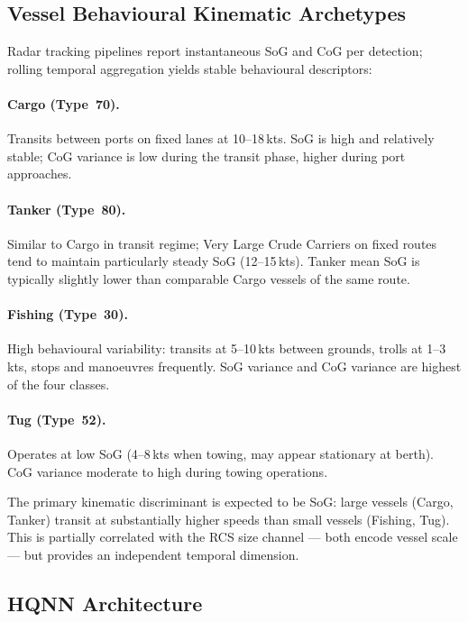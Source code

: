 \documentclass[journal]{IEEEtran}
\begin{document}
\subsection{Vessel Behavioural Kinematic Archetypes}

Radar tracking pipelines report instantaneous SoG and CoG per
detection; rolling temporal aggregation yields stable behavioural
descriptors:

\paragraph{Cargo (Type~70).} Transits between ports on fixed lanes at
10--18\,kts. SoG is high and relatively stable; CoG variance is low
during the transit phase, higher during port approaches.

\paragraph{Tanker (Type~80).} Similar to Cargo in transit regime; Very
Large Crude Carriers on fixed routes tend to maintain particularly
steady SoG (12--15\,kts). Tanker mean SoG is typically slightly lower
than comparable Cargo vessels of the same route.

\paragraph{Fishing (Type~30).} High behavioural variability: transits
at 5--10\,kts between grounds, trolls at 1--3\,kts, stops and
manoeuvres frequently. SoG variance and CoG variance are highest of the
four classes.

\paragraph{Tug (Type~52).} Operates at low SoG (4--8\,kts when towing,
may appear stationary at berth). CoG variance moderate to high during
towing operations.

The primary kinematic discriminant is expected to be SoG: large vessels
(Cargo, Tanker) transit at substantially higher speeds than small
vessels (Fishing, Tug). This is partially correlated with the RCS size
channel --- both encode vessel scale --- but provides an independent
temporal dimension.

\subsection{HQNN Architecture}
\end{document}
